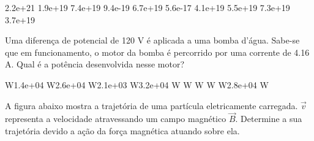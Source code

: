 \documentclass[12pt, addpoints]{exam}
\begin{document}
\begin{questions}
\begin{multicols*}{2}
\begin{oneparchoices}
\choice 2.2e+21 \choice 1.9e+19 \choice 7.4e+19 \choice 9.4e-19 \choice 6.7e+19 \choice 5.6e-17 \choice 4.1e+19 \choice 5.5e+19 \choice 7.3e+19 \choice 3.7e+19 
\end{oneparchoices}\question Uma diferença de potencial de 120 V é aplicada a uma bomba d’água. Sabe-se que em funcionamento, o motor da bomba é percorrido por uma corrente de    4.16 A. Qual é a potência desenvolvida nesse motor?

\begin{oneparchoices}
 W\choice 1.4e+04 W\choice 2.6e+04 W\choice 2.1e+03 W\choice 3.2e+04 W W W W W\choice 2.8e+04 W
\end{oneparchoices}\question A ﬁgura abaixo mostra a trajetória de uma partícula eletricamente carregada. $\vec{{v}}$ representa a velocidade atravessando um campo magnético $\vec{{B}}$. Determine a sua trajetória devido a ação da força magnética atuando sobre ela.
        
        \begin{center}
            \begin{minipage}[c]{0.5\linewidth}
            \end{minipage}
        \end{center}

        


\end{multicols*}
\end{questions}
\end{document}
